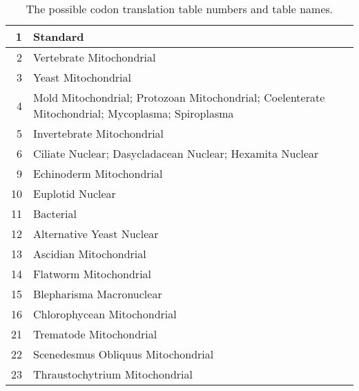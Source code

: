 \begin{table}
\begin{small}
\begin{center}
\begin{tabular}{|r|p{}|}\hline
 1&Standard\\\hline
 2&Vertebrate Mitochondrial\\\hline
 3&Yeast Mitochondrial\\\hline
 4&Mold Mitochondrial; Protozoan Mitochondrial; Coelenterate
Mitochondrial; Mycoplasma; Spiroplasma\\\hline
 5&Invertebrate Mitochondrial\\\hline
 6&Ciliate Nuclear; Dasycladacean Nuclear; Hexamita Nuclear\\\hline
 9&Echinoderm Mitochondrial\\\hline
 10&Euplotid Nuclear\\\hline
 11&Bacterial\\\hline
 12&Alternative Yeast Nuclear\\\hline
 13&Ascidian Mitochondrial\\\hline
 14&Flatworm Mitochondrial\\\hline
 15&Blepharisma Macronuclear\\\hline
 16&Chlorophycean Mitochondrial\\\hline
 21&Trematode Mitochondrial\\\hline
 22&Scenedesmus Obliquus Mitochondrial\\\hline
 23&Thraustochytrium Mitochondrial\\\hline
\end{tabular}
\end{center}
\caption{The possible codon translation table numbers and table names.}
\label{Codontranstables}
\end{small}
\end{table}
